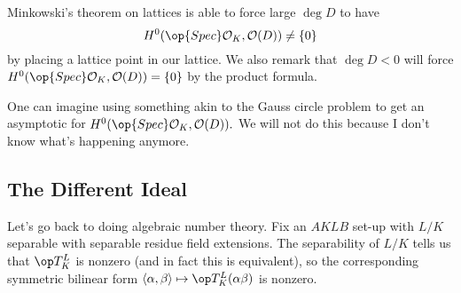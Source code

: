 \documentclass[../notes.tex]{subfiles}
\begin{document}
Minkowski's theorem on lattices is able to force large $\deg D$ to have
\[H^0(\op{Spec}\mathcal O_K,\mathcal O(D))\ne\{0\}\]
by placing a lattice point in our lattice. We also remark that $\deg D<0$ will force $H^0(\op{Spec}\mathcal O_K,\mathcal O(D))=\{0\}$ by the product formula.
\begin{remark}
	One can imagine using something akin to the Gauss circle problem to get an asymptotic for $H^0(\op{Spec}\mathcal O_K,\mathcal O(D)).$ We will not do this because I don't know what's happening anymore.
\end{remark}

\subsection{The Different Ideal}
Let's go back to doing algebraic number theory. Fix an $AKLB$ set-up with $L/K$ separable with separable residue field extensions. The separability of $L/K$ tells us that $\op T^L_K$ is nonzero (and in fact this is equivalent), so the corresponding symmetric bilinear form $\langle\alpha,\beta\rangle\mapsto\op T^L_K(\alpha\beta)$ is nonzero.
\end{document}
